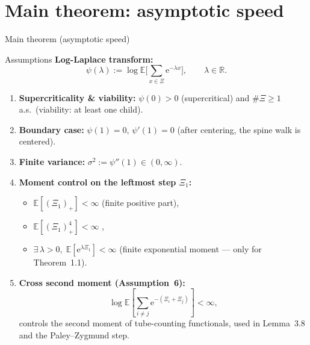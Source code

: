 \documentclass[10pt, aspectratio=169]{beamer}
\newcommand{\R}{\mathbb{R}}
\newcommand{\E}{\mathbb{E}}
\newcommand{\e}{\mathrm{e}}
\begin{document}
\section{Main theorem: asymptotic speed}

\begin{frame}{Main theorem (asymptotic speed)}
    
\end{frame}

\begin{frame}{Assumptions}
    \small
    \textbf{Log-Laplace transform:}
    \[
        \psi(\lambda):=\log\E\Big[\sum_{x\in\Xi}\e^{-\lambda x}\Big],\qquad \lambda\in\R.
    \]
    \vspace{-2mm}
    \begin{enumerate}
        \item \textbf{Supercriticality \& viability:} $\psi(0)>0$ (supercritical) and $\#\Xi\ge 1$ a.s.\ (viability: at least one child).
        \item \textbf{Boundary case:} $\psi(1)=0$, $\psi'(1)=0$ (after centering, the spine walk is centered).
        \item \textbf{Finite variance:} $\sigma^2:=\psi''(1)\in(0,\infty)$.
        \item \textbf{Moment control on the leftmost step $\Xi_1$:}
        \begin{itemize}
            \item $\E[(\Xi_1)_+] < \infty$ \quad (finite positive part),
            \item {\color{gray}\sout{$\E[(\Xi_1)_+^4] < \infty$}} ,
            \item {\color{gray!60!white} $\exists\,\lambda>0,\; \E[\e^{\lambda\Xi_1}] < \infty$ \quad (finite exponential moment --- only for Theorem~1.1)}.
        \end{itemize}
        \item \textbf{Cross second moment (Assumption~6):}
        \[
            \log \E\!\left[\sum_{i\neq j}\e^{-(\Xi_i+\Xi_j)}\right] < \infty,
        \]
        controls the second moment of tube-counting functionals, used in Lemma~3.8 and the Paley--Zygmund step.
    \end{enumerate}
\end{frame}
\end{document}
